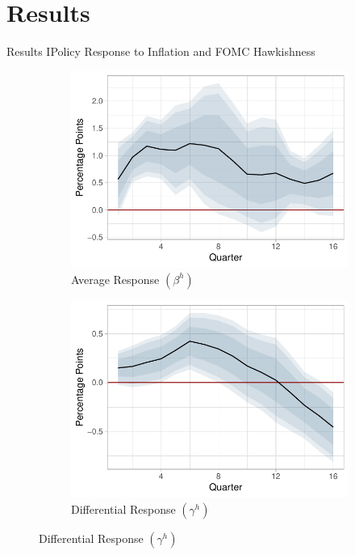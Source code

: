 \documentclass[11pt,pdf,aspectratio=129]{beamer}
\begin{document}
    




\section{Results}

\begin{frame}{Results I}{Policy Response to Inflation and FOMC Hawkishness}

    \begin{figure}[!htbp]\centering
        \label{fig:LP}
        \begin{subfigure}[b]{0.49\textwidth}
            \centering
            \caption{Average Response $(\beta^h)$}
            \label{fig:AverageResponce}
            \includegraphics[width=\linewidth]{Average.pdf}
        \end{subfigure}
        \hfill
        \begin{subfigure}[b]{0.49\textwidth}
            \centering
            \caption{Differential Response $(\gamma^h)$}
            \label{fig:DifferentialResponce}
            \includegraphics[width=\linewidth]{Differential.pdf}

\end{subfigure}
\end{figure}
\end{frame}
\end{document}
